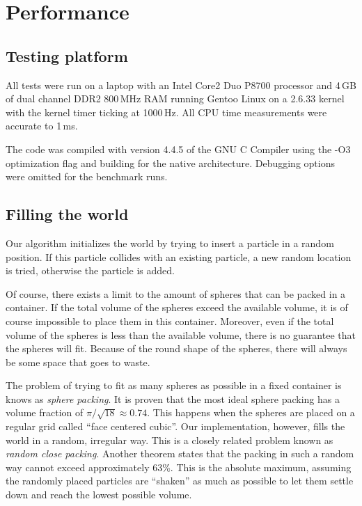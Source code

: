 
\section{Performance}
\subsection{Testing platform}

All tests were run on a laptop with an Intel Core2 Duo P8700 processor and 
4\,GB of dual channel DDR2 800\,MHz RAM running Gentoo Linux on a 2.6.33 
kernel with the kernel timer ticking at 1000\,Hz. All CPU time measurements 
were accurate to 1\,ms.

The code was compiled with version 4.4.5 of the GNU C Compiler using the 
-O3 optimization flag and building for the native architecture. Debugging  
options were omitted for the benchmark runs.


\subsection{Filling the world}
Our algorithm initializes the world by trying to insert a particle in a 
random position. If this particle collides with an existing particle, a new 
random location is tried, otherwise the particle is added.

Of course, there exists a limit to the amount of spheres that can be packed in 
a container. If the total volume of the spheres exceed the available volume, it 
is of course impossible to place them in this container.  Moreover, even if the 
total volume of the spheres is less than the available volume, there is no 
guarantee that the spheres will fit. Because of the round shape of the spheres, 
there will always be some space that goes to waste.

The problem of trying to fit as many spheres as possible in a fixed 
container is knows as \emph{sphere packing}. It is proven\cite{idealPacking}
that the most ideal sphere packing has a volume fraction of $\pi / \sqrt{18}
\approx 0.74$. This happens when the spheres are placed on a regular grid
called  ``face centered cubic''. Our implementation, however, fills the 
world in a random, irregular way. This is a closely related problem known 
as \emph{random close packing}. Another theorem\cite{randomPacking} states that 
the packing in such a random way cannot exceed approximately 63\%. This is the 
absolute maximum, assuming the randomly placed particles are ``shaken'' as much 
as possible to let them settle down and reach the lowest possible volume.

